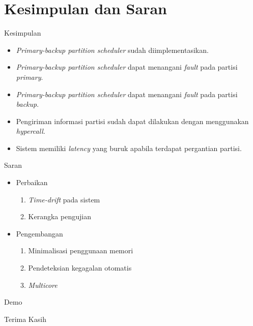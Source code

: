 \documentclass[xetex]{beamer}
\begin{document}
\section{Kesimpulan dan Saran}

\begin{frame}{Kesimpulan}
	\begin{itemize}
		\item \textit{Primary-backup partition scheduler} sudah diimplementasikan.
		\item \textit{Primary-backup partition scheduler} dapat menangani \textit{fault} pada partisi \textit{primary}.
		\item \textit{Primary-backup partition scheduler} dapat menangani \textit{fault} pada partisi \textit{backup}.
		\item Pengiriman informasi partisi sudah dapat dilakukan dengan menggunakan \textit{hypercall}.
		\item Sistem memiliki \textit{latency} yang buruk apabila terdapat pergantian partisi.
	\end{itemize}
\end{frame}

\begin{frame}{Saran}
	\begin{itemize}
		\item Perbaikan

			\begin{enumerate}
				\item \textit{Time-drift} pada sistem
				\item Kerangka pengujian
			\end{enumerate}

		\item Pengembangan

			\begin{enumerate}
				\item Minimalisasi penggunaan memori
				\item Pendeteksian kegagalan otomatis
				\item \textit{Multicore}
			\end{enumerate}
	
	\end{itemize}

\end{frame}

\begin{frame}[standout]
	\centering Demo
\end{frame}

\begin{frame}[standout]
	\centering Terima Kasih
\end{frame}
\end{document}

